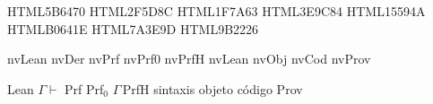 %

\definecolor{nvLean}  {HTML}{5B6470}   %
\definecolor{nvDer}   {HTML}{2F5D8C}   %
\definecolor{nvPrf}   {HTML}{1F7A63}   %
\definecolor{nvPrf0}  {HTML}{3E9C84}   %
\definecolor{nvPrfH}  {HTML}{15594A}   %
\definecolor{nvObj}   {HTML}{B0641E}   %
\definecolor{nvCod}   {HTML}{7A3E9D}   %
\definecolor{nvProv}  {HTML}{9B2226}   %

\makeatletter
\newcommand{\rpp@nvcolor}[1]{%
  \ifcsname nvcol@#1\endcsname \csname nvcol@#1\endcsname \else nvLean\fi}
\expandafter\def\csname nvcol@Lean\endcsname{nvLean}
\expandafter\def\csname nvcol@derives\endcsname{nvDer}
\expandafter\def\csname nvcol@Prf\endcsname{nvPrf}
\expandafter\def\csname nvcol@Prf0\endcsname{nvPrf0}
\expandafter\def\csname nvcol@PrfH\endcsname{nvPrfH}
\expandafter\def\csname nvcol@sintaxis\endcsname{nvLean}
\expandafter\def\csname nvcol@objeto\endcsname{nvObj}
\expandafter\def\csname nvcol@codigo\endcsname{nvCod}
\expandafter\def\csname nvcol@Prov\endcsname{nvProv}

\newcommand{\rpp@nvlabel}[1]{%
  \ifcsname nvlab@#1\endcsname \csname nvlab@#1\endcsname \else #1\fi}
\expandafter\def\csname nvlab@Lean\endcsname{Lean}
\expandafter\def\csname nvlab@derives\endcsname{$\Gamma\vdash$}
\expandafter\def\csname nvlab@Prf\endcsname{Prf}
\expandafter\def\csname nvlab@Prf0\endcsname{Prf$_0$}
\expandafter\def\csname nvlab@PrfH\endcsname{$\Gamma\,$PrfH}
\expandafter\def\csname nvlab@sintaxis\endcsname{sintaxis}
\expandafter\def\csname nvlab@objeto\endcsname{objeto}
\expandafter\def\csname nvlab@codigo\endcsname{código}
\expandafter\def\csname nvlab@Prov\endcsname{Prov}

